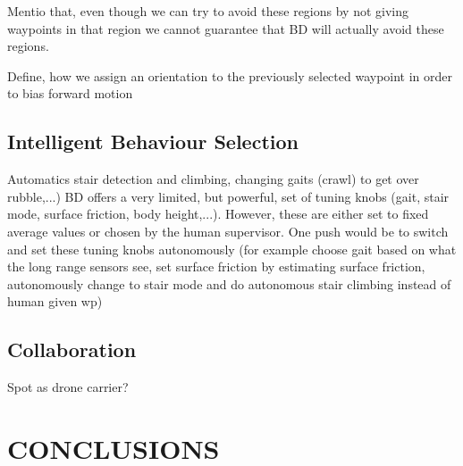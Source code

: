 \documentclass[a4paper, 10pt, conference]{ieeeconf}      %
\begin{document}
Mentio that, even though we can try to avoid these regions by not giving waypoints in that region we cannot guarantee that BD will actually avoid these regions.

Define, how we assign an orientation to the previously selected waypoint in order to bias forward motion


\subsection{Intelligent Behaviour Selection}
Automatics stair detection and climbing, changing gaits (crawl) to get over rubble,...)
BD offers a very limited, but powerful, set of tuning knobs (gait, stair mode, surface friction, body height,...).
However, these are either set to fixed average values or chosen by the human supervisor.
One push would be to switch and set these tuning knobs autonomously (for example choose gait based on what the long range sensors see, set surface friction by estimating surface friction, autonomously change to stair mode and do autonomous stair climbing instead of human given wp)


\subsection{Collaboration}
Spot as drone carrier?
\subsection{}
\section{CONCLUSIONS}



\addtolength{\textheight}{-12cm}   %

\end{document}
